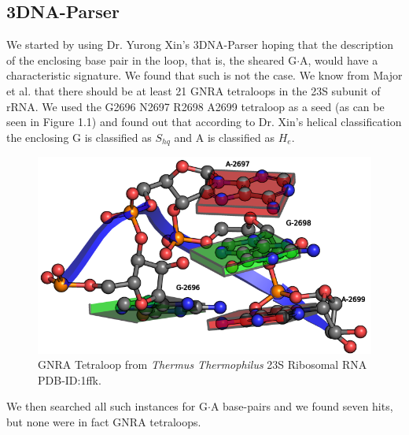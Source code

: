 \documentclass[10pt, oneside, pdftex]{article}
\begin{document}
\subsection{3DNA-Parser}
We started by using Dr. Yurong Xin's 3DNA-Parser hoping that the
description of the enclosing base pair in the loop, that is, the
sheared G$\cdot$A, would have a characteristic signature.
We found that such is not the case. We know from Major et
al. \cite{lemieux2006} that there should be at least 21 GNRA tetraloops
in the 23S subunit of rRNA. We used the G2696 N2697 R2698 A2699
tetraloop as a seed (as can be seen in Figure 1.1) and found out
that according to Dr. Xin's helical classification the enclosing G is
classified as $S_{hq}$ and A is classified as $H_{e}$. 
\begin{figure}[htbp]
\centering 
\includegraphics[angle=0, scale=0.5]{gnra.png}
\caption{GNRA Tetraloop from \textit{Thermus Thermophilus} 23S Ribosomal RNA PDB-ID:1ffk.}
\end{figure}
We then searched all such instances for G$\cdot$A base-pairs and we found seven hits,
but none were in fact GNRA tetraloops.
\end{document}
